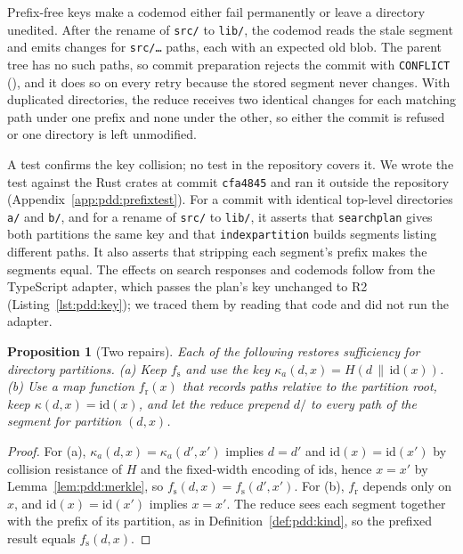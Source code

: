 \documentclass[11pt,letterpaper]{article}
\newtheorem{proposition}[theorem]{Proposition}
\theoremstyle{definition}
\theoremstyle{remark}
\newcommand{\id}{\mathrm{id}}
\DeclareRobustCommand{\code}[1]{{\def\_{\textunderscore\allowbreak}\texttt{#1}}}
\begin{document}
Prefix-free keys make a codemod either fail permanently or leave a directory unedited. After the rename of \code{src/} to \code{lib/}, the codemod reads the stale segment and emits changes for \code{src/\ldots} paths, each with an expected old blob. The parent tree has no such paths, so commit preparation rejects the commit with \code{CONFLICT} (), and it does so on every retry because the stored segment never changes. With duplicated directories, the reduce receives two identical changes for each matching path under one prefix and none under the other, so either the commit is refused or one directory is left unmodified.

A test confirms the key collision; no test in the repository covers it. We wrote the test against the Rust crates at commit \code{cfa4845} and ran it outside the repository (Appendix~\ref{app:pdd:prefixtest}). For a commit with identical top-level directories \code{a/} and \code{b/}, and for a rename of \code{src/} to \code{lib/}, it asserts that \code{search\_plan} gives both partitions the same key and that \code{index\_partition} builds segments listing different paths. It also asserts that stripping each segment's prefix makes the segments equal. The effects on search responses and codemods follow from the TypeScript adapter, which passes the plan's key unchanged to R2 (Listing~\ref{lst:pdd:key}); we traced them by reading that code and did not run the adapter.

\begin{proposition}[Two repairs]
\label{prop:pdd:repairs}
Each of the following restores sufficiency for directory partitions. (a) Keep $f_{\mathrm{s}}$ and use the key $\kappa_a(d,x)=H(d\,\|\,\id(x))$. (b) Use a map function $f_{\mathrm{r}}(x)$ that records paths relative to the partition root, keep $\kappa(d,x)=\id(x)$, and let the reduce prepend $d/$ to every path of the segment for partition $(d,x)$.
\end{proposition}

\begin{proof}
For (a), $\kappa_a(d,x)=\kappa_a(d',x')$ implies $d=d'$ and $\id(x)=\id(x')$ by collision resistance of $H$ and the fixed-width encoding of ids, hence $x=x'$ by Lemma~\ref{lem:pdd:merkle}, so $f_{\mathrm{s}}(d,x)=f_{\mathrm{s}}(d',x')$. For (b), $f_{\mathrm{r}}$ depends only on $x$, and $\id(x)=\id(x')$ implies $x=x'$. The reduce sees each segment together with the prefix of its partition, as in Definition~\ref{def:pdd:kind}, so the prefixed result equals $f_{\mathrm{s}}(d,x)$.
\end{proof}
\end{document}
